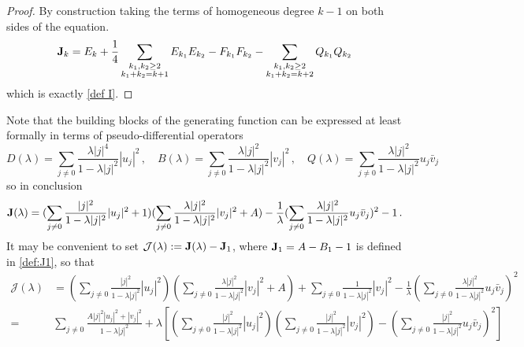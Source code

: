\documentclass[reqno,11pt]{amsart}
\theoremstyle{plain}
\numberwithin{equation}{section}
\newcommand{\I}{{\texttt{\bf J}}}
\newcommand{\red}[1]{\textcolor{red}{#1}}
\begin{document}
{\begin{proof}
	By construction taking the terms of homogeneous degree $k-1$ on both sides of the equation.
	\[
	\I_k = E_k +\frac14 \sum_{\substack{k_1,k_2\geq 2\\ k_1+k_2 = k+1}} E_{k_1} E_{k_2} - F_{k_1} F_{k_2} - 
	\sum_{\substack{k_1,k_2\geq 2\\ k_1+k_2 = k+2} }Q_{k_1} Q_{k_2} 
	\]	
	which is exactly \eqref{def I}.
\end{proof}
Note that the building blocks of the generating function can be expressed at least formally in terms of pseudo-differential operators
\begin{equation}
	\label{cita}
	D(\lambda) = \sum_{j \neq 0} \frac{\lambda |j|^4}{1 - \lambda |j|^2} |u_j|^2\,,\quad B(\lambda) = \sum_{j \neq 0} \frac{\lambda |j|^2}{1 - \lambda |j|^2} |v_j|^2\,,\quad  Q(\lambda) = \sum_{j \neq 0} \frac{\lambda |j|^2}{1 - \lambda |j|^2}  u_j \bar v_j
\end{equation}
so in conclusion
\[
\I(\lambda)= (\sum_{j\ne 0}  \frac{ |j|^2}{1 - \lambda |j|^2} |u_j|^2+1)(\sum_{j \neq 0}  \frac{\lambda |j|^2}{1 - \lambda |j|^2} |v_j|^2 +A) -\frac1\lambda (\sum_{j \neq 0} \frac{\lambda |j|^2}{1 - \lambda |j|^2} u_j \bar v_j)^2 -1\,.
\]
It may be convenient to set $\mathcal J(\lambda):= \I(\lambda)-\I_1$, where $\I_1=A-B_1-1$ is defined in \eqref{def:J1},  so that 
\[
\begin{aligned}
	\mathcal J(\lambda)&=\left( \sum_{j \neq 0} \frac{|j|^2}{1 - \lambda |j|^2} |u_j|^2 \right) \left( \sum_{j \neq 0} \frac{\lambda |j|^2}{1 - \lambda |j|^2} |v_j|^2 + A \right) + \sum_{j \neq 0} \frac{1}{1 - \lambda |j|^2} |v_j|^2 - \frac{1}{\lambda} \left( \sum_{j \neq 0} \frac{\lambda |j|^2}{1 - \lambda |j|^2} u_j \bar{v}_j \right)^2\\
	=& \sum_{j \neq 0}  \frac{ A |j|^2  |u_j|^2+|v_j|^2}{1 - \lambda |j|^2} + \lambda \left[\left( \sum_{j \neq 0} \frac{|j|^2}{1 - \lambda |j|^2} |u_j|^2 \right) \left( \sum_{j \neq 0} \frac{ |j|^2}{1 - \lambda |j|^2} |v_j|^2 \right) - \left( \sum_{j \neq 0} \frac{ |j|^2}{1 - \lambda |j|^2} u_j \bar{v}_j \right)^2\right]

\end{aligned}\]}
\end{document}
